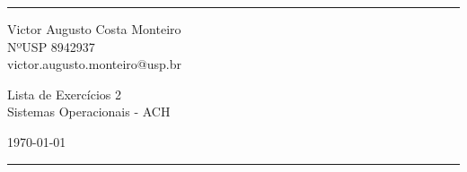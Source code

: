 \documentclass[10pt, a4paper]{article}
\begin{document}

\fancyhead[C]{}
\hrule \medskip %
\begin{minipage}{0.295\textwidth} 
    \raggedright
    \footnotesize
    Victor Augusto Costa Monteiro \hfill\\   
    NºUSP 8942937 \hfill\\
    victor.augusto.monteiro@usp.br
\end{minipage}
\begin{minipage}{0.4\textwidth} 
    \centering 
    \large 
    Lista de Exercícios 2\\ 
    \normalsize 
    Sistemas Operacionais - ACH\\ 
\end{minipage}
\begin{minipage}{0.295\textwidth} 
    \raggedleft
    \today\hfill\\
\end{minipage}
\medskip\hrule 











\end{document}
